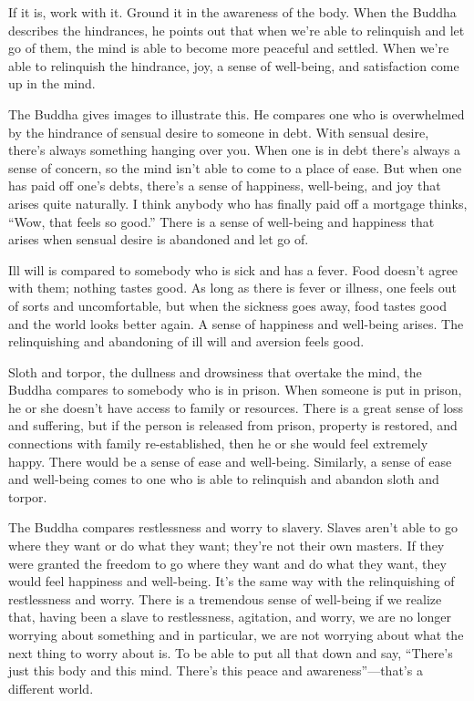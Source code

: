 If it is, work with it. Ground it in the awareness of the body. When the
Buddha describes the hindrances, he points out that when we’re able to
relinquish and let go of them, the mind is able to become more peaceful
and settled. When we’re able to relinquish the hindrance, joy, a sense
of well-being, and satisfaction come up in the mind.

The Buddha gives images to illustrate this. He compares one who is
overwhelmed by the hindrance of sensual desire to someone in debt. With
sensual desire, there’s always something hanging over you. When one is
in debt there’s always a sense of concern, so the mind isn’t able to
come to a place of ease. But when one has paid off one’s debts, there’s
a sense of happiness, well-being, and joy that arises quite naturally. I
think anybody who has finally paid off a mortgage thinks, “Wow, that
feels so good.” There is a sense of well-being and happiness that arises
when sensual desire is abandoned and let go of.

Ill will is compared to somebody who is sick and has a fever. Food
doesn’t agree with them; nothing tastes good. As long as there is fever
or illness, one feels out of sorts and uncomfortable, but when the
sickness goes away, food tastes good and the world looks better again. A
sense of happiness and well-being arises. The relinquishing and
abandoning of ill will and aversion feels good.

Sloth and torpor, the dullness and drowsiness that overtake the mind,
the Buddha compares to somebody who is in prison. When someone is put in
prison, he or she doesn’t have access to family or resources. There is a
great sense of loss and suffering, but if the person is released from
prison, property is restored, and connections with family
re-established, then he or she would feel extremely happy. There would
be a sense of ease and well-being. Similarly, a sense of ease and
well-being comes to one who is able to relinquish and abandon sloth and
torpor.

The Buddha compares restlessness and worry to slavery. Slaves aren’t
able to go where they want or do what they want; they’re not their own
masters. If they were granted the freedom to go where they want and do
what they want, they would feel happiness and well-being. It’s the same
way with the relinquishing of restlessness and worry. There is a
tremendous sense of well-being if we realize that, having been a slave
to restlessness, agitation, and worry, we are no longer worrying about
something and in particular, we are not worrying about what the next
thing to worry about is. To be able to put all that down and say,
“There’s just this body and this mind. There’s this peace and
awareness”—that’s a different world.

